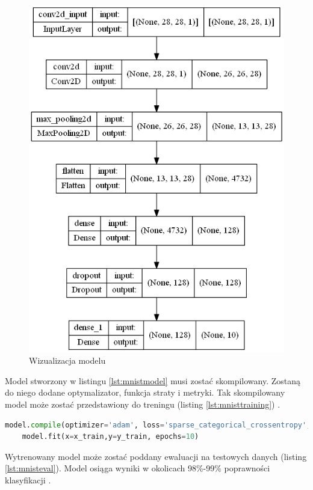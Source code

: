 \documentclass[a4paper,12pt,oneside]{book} %
\begin{document}
\begin{figure}[h]
	\centering
	\includegraphics[scale=0.4]{model_plot.png}
	\caption{Wizualizacja modelu}
	\label{model_plot}
\end{figure}

Model stworzony w listingu \ref{lst:mnistmodel} musi zostać skompilowany. Zostaną do niego dodane optymalizator, funkcja straty i metryki. Tak skompilowany model może zostać przedstawiony do treningu (listing \ref{lst:mnisttraining}) \cite{mnistapp}. 

\begin{lstlisting}[language=Python, caption={Kompilacja i trening modelu \cite{mnistapp}}, label={lst:mnisttraining}]
	model.compile(optimizer='adam', loss='sparse_categorical_crossentropy', metrics=['accuracy'])
	model.fit(x=x_train,y=y_train, epochs=10)
\end{lstlisting}

Wytrenowany model może zostać poddany ewaluacji na testowych danych (listing \ref{lst:mnisteval}). Model osiąga wyniki w okolicach 98\%-99\% poprawności klasyfikacji \cite{mnistapp}. 
\end{document}
